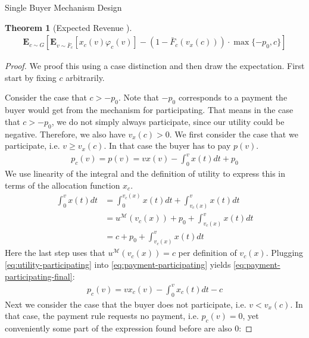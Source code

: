 \documentclass[11pt,a4paper]{article}
\newtheorem{theorem}{Theorem}
\newcommand{\1}[1]{\mbox{\rm\bf 1}_{#1}}
\begin{document}
\begin{section}{Single Buyer Mechanism Design}
\begin{theorem}[Expected Revenue \cite{primary}]
     \begin{align*}
         \mathbf{E}_{c \sim G}\left[\mathbf{E}_{v\sim\bar{F}_c}\left[x_c(v)\varphi_c(v)\right] - (1-\bar{F}_c(v_x(c))) \cdot \max\{-p_0,c\}\right]
     \end{align*}
 \end{theorem}

 \begin{proof}
     We proof this using a case distinction and then draw the expectation.
     First start by fixing $c$ arbitrarily.

     Consider the case that $c > -p_0$. Note that $-p_0$ corresponds to a payment the buyer would get from the mechanism for participating.
     That means in the case that $c > -p_0$, we do not simply always participate, since our utility could be negative. Therefore, we also have $v_x(c) > 0$.
     We first consider the case that we participate, i.e. $v \geq v_x(c)$.
     In that case the buyer has to pay $p(v)$.
     \begin{align}
         \label{eq:payment-participating}
         p_c(v) = p(v) = v x(v) - \int_0^v x(t) dt + p_0
     \end{align}
     We use linearity of the integral and the definition of utility to express this in terms of the allocation function $x_c$.
     \begin{equation}
         \label{eq:utility-participating}
         \begin{aligned}
             \int_0^v x(t) dt & = \int_0^{v_c(x)} x(t) dt + \int_{v_c(x)}^v x(t) dt     \\
                              & = u^\mathcal{M}(v_c(x)) + p_0 + \int_{v_c(x)}^v x(t) dt \\
                              & = c + p_0 + \int_{v_c(x)}^v x(t) dt
         \end{aligned}
     \end{equation}
     Here the last step uses that $u^\mathcal{M}(v_c(x)) = c$ per definition of $v_c(x)$.
     Plugging \autoref{eq:utility-participating} into \autoref{eq:payment-participating} yields \autoref{eq:payment-participating-final}:
     \begin{align}
         \label{eq:payment-participating-final}
         p_c(v) = v x_c(v) - \int_0^v x_c(t) dt - c
     \end{align}
     Next we consider the case that the buyer does not participate, i.e. $v < v_x(c)$.
     In that case, the payment rule requests no payment, i.e. $p_c(v) = 0$, yet conveniently some part of the expression found before are also $0$:

\end{proof}
\end{section}
\end{document}

